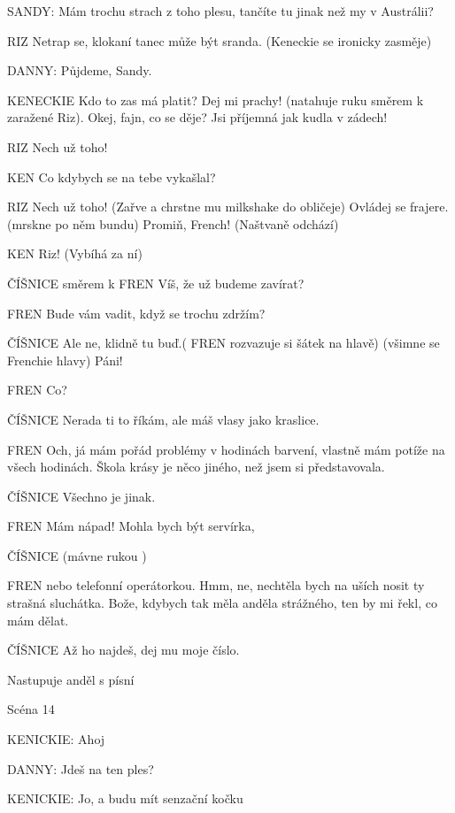 \rep SANDY:        Mám trochu strach z toho plesu, tančíte tu jinak než my v Austrálii? 

RIZ                Netrap se, klokaní tanec může být sranda. (Keneckie se ironicky                 zasměje) 

\rep DANNY:        Půjdeme, Sandy. 

KENECKIE        Kdo to zas má platit? Dej mi prachy! (natahuje ruku směrem k zaražené         Riz). Okej, fajn, co se děje? Jsi příjemná jak kudla v zádech! 

RIZ                Nech už toho! 

KEN        Co kdybych se na tebe vykašlal? 

RIZ                Nech už toho! (Zařve a chrstne mu milkshake do obličeje) Ovládej se         frajere. (mrskne po něm bundu) Promiň, French! (Naštvaně odchází)

KEN         Riz! (Vybíhá za ní) 

ČÍŠNICE          směrem k FREN  Víš, že už budeme zavírat? 

FREN        Bude vám vadit, když se trochu zdržím?

ČÍŠNICE         Ale ne, klidně tu buď.( FREN rozvazuje si šátek na hlavě) (všimne se         Frenchie hlavy) Páni! 

FREN        Co? 

ČÍŠNICE        Nerada ti to říkám, ale máš vlasy jako kraslice. 

FREN        Och, já mám pořád problémy v hodinách barvení, vlastně mám potíže         na všech hodinách. Škola krásy je něco jiného, než jsem si                         představovala. 

ČÍŠNICE         Všechno je jinak.

FREN        Mám nápad! Mohla bych být servírka,

ČÍŠNICE        (mávne rukou ) 

FREN        nebo telefonní operátorkou. Hmm, ne, nechtěla bych na uších nosit ty         strašná sluchátka. Bože, kdybych tak měla anděla strážného, ten by mi         řekl, co mám dělat. 

ČÍŠNICE         Až ho najdeš, dej mu moje číslo. 

Nastupuje anděl s písní 

Scéna 14 

\rep KENICKIE:                 Ahoj

\rep DANNY:        Jdeš na ten ples?

\rep KENICKIE:        Jo, a budu mít senzační kočku

